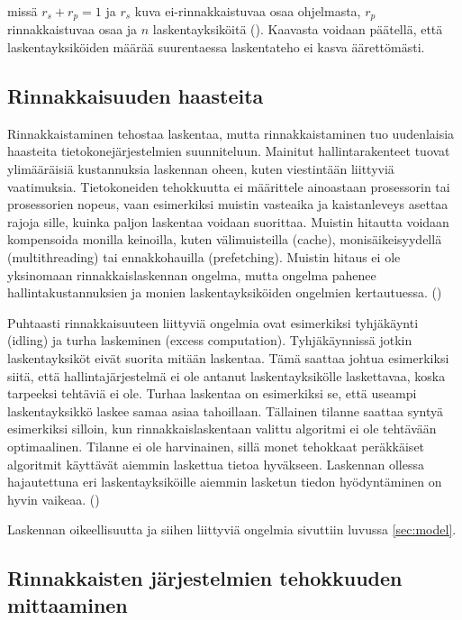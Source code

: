 missä $r_s + r_p = 1$ ja $r_s$ kuva ei-rinnakkaistuvaa osaa ohjelmasta,
$r_p$ rinnakkaistuvaa osaa ja $n$ laskentayksiköitä (\citealt{amdahl}).
Kaavasta voidaan päätellä, että laskentayksiköiden määrää suurentaessa
laskentateho ei kasva äärettömästi.

\subsection{Rinnakkaisuuden haasteita}

Rinnakkaistaminen tehostaa laskentaa, mutta rinnakkaistaminen tuo
uudenlaisia haasteita tietokonejärjestelmien suunniteluun. Mainitut
hallintarakenteet tuovat ylimääräisiä kustannuksia laskennan oheen,
kuten viestintään liittyviä vaatimuksia.
Tietokoneiden tehokkuutta ei määrittele ainoastaan prosessorin tai
prosessorien nopeus, vaan esimerkiksi muistin vasteaika ja kaistanleveys
asettaa rajoja sille, kuinka paljon laskentaa voidaan suorittaa. Muistin
hitautta voidaan kompensoida monilla keinoilla, kuten välimuisteilla (cache),
monisäikeisyydellä (multithreading) tai ennakkohauilla (prefetching). Muistin
hitaus ei ole yksinomaan rinnakkaislaskennan ongelma, mutta ongelma pahenee
hallintakustannuksien ja monien laskentayksiköiden ongelmien kertautuessa.
(\citealt{intro})

Puhtaasti rinnakkaisuuteen liittyviä ongelmia ovat esimerkiksi tyhjäkäynti
(idling) ja turha laskeminen (excess computation). Tyhjäkäynnissä jotkin
laskentayksiköt eivät suorita mitään laskentaa. Tämä saattaa johtua esimerkiksi
siitä, että hallintajärjestelmä ei ole antanut laskentayksikölle laskettavaa,
koska tarpeeksi tehtäviä ei ole. Turhaa
laskentaa on esimerkiksi se, että useampi laskentayksikkö laskee samaa asiaa
tahoillaan. Tällainen tilanne saattaa syntyä esimerkiksi silloin, kun
rinnakkaislaskentaan valittu algoritmi ei ole tehtävään optimaalinen. Tilanne
ei ole harvinainen, sillä monet tehokkaat peräkkäiset algoritmit käyttävät
aiemmin laskettua tietoa hyväkseen. Laskennan ollessa hajautettuna eri
laskentayksiköille aiemmin lasketun tiedon hyödyntäminen on hyvin vaikeaa.
(\citealt{intro})

Laskennan oikeellisuutta ja siihen liittyviä ongelmia sivuttiin luvussa
\ref{sec:model}.

\subsection{Rinnakkaisten järjestelmien tehokkuuden mittaaminen}
\label{sec:measurement}

